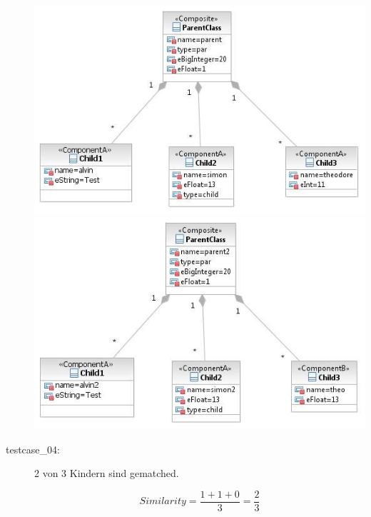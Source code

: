 \documentclass[a4paper]{article}
\begin{document}
\begin{description}
	\includegraphics[scale=0.5]{CompareChildrenMatchedOrSimilarTestScreens/Testcase03model1.jpeg}
	\includegraphics[scale=0.5]{CompareChildrenMatchedOrSimilarTestScreens/Testcase03model2.jpeg}

  \item[testcase\_04:]  2 von 3 Kindern sind gematched.
    
   \begin{equation*}
   Similarity = \frac{1+1+0}{3}=\frac{2}{3}
   \end{equation*}
    

\end{description}
\end{document}

